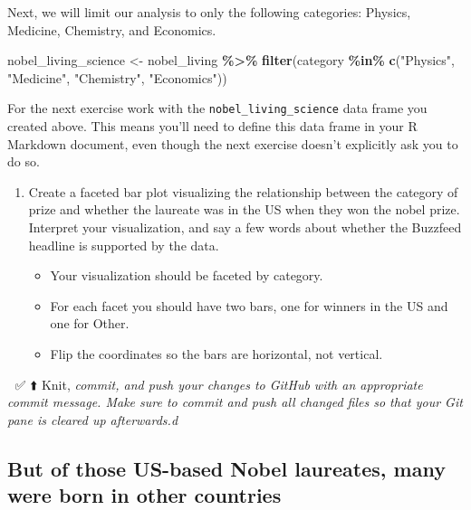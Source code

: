 \documentclass[
]{article}
\newenvironment{Shaded}{\begin{snugshade}}{\end{snugshade}}
\newcommand{\FunctionTok}[1]{\textcolor[rgb]{0.13,0.29,0.53}{\textbf{#1}}}
\newcommand{\NormalTok}[1]{#1}
\newcommand{\OtherTok}[1]{\textcolor[rgb]{0.56,0.35,0.01}{#1}}
\newcommand{\SpecialCharTok}[1]{\textcolor[rgb]{0.81,0.36,0.00}{\textbf{#1}}}
\newcommand{\StringTok}[1]{\textcolor[rgb]{0.31,0.60,0.02}{#1}}
\providecommand{\tightlist}{%
  \setlength{\itemsep}{0pt}\setlength{\parskip}{0pt}}
\begin{document}
Next, we will limit our analysis to only the following categories:
Physics, Medicine, Chemistry, and Economics.

\begin{Shaded}
\begin{Highlighting}[]
\NormalTok{nobel\_living\_science }\OtherTok{\textless{}{-}}\NormalTok{ nobel\_living }\SpecialCharTok{\%\textgreater{}\%}
  \FunctionTok{filter}\NormalTok{(category }\SpecialCharTok{\%in\%} \FunctionTok{c}\NormalTok{(}\StringTok{"Physics"}\NormalTok{, }\StringTok{"Medicine"}\NormalTok{, }\StringTok{"Chemistry"}\NormalTok{, }\StringTok{"Economics"}\NormalTok{))}
\end{Highlighting}
\end{Shaded}

For the next exercise work with the \texttt{nobel\_living\_science} data
frame you created above. This means you'll need to define this data
frame in your R Markdown document, even though the next exercise doesn't
explicitly ask you to do so.

\begin{enumerate}
\def\labelenumi{\arabic{enumi}.}
\setcounter{enumi}{2}
\item
  Create a faceted bar plot visualizing the relationship between the
  category of prize and whether the laureate was in the US when they won
  the nobel prize. Interpret your visualization, and say a few words
  about whether the Buzzfeed headline is supported by the data.

  \begin{itemize}
  \tightlist
  \item
    Your visualization should be faceted by category.
  \item
    For each facet you should have two bars, one for winners in the US
    and one for Other.
  \item
    Flip the coordinates so the bars are horizontal, not vertical.
  \end{itemize}
\end{enumerate}

🧶 ✅ ⬆️ Knit, \emph{commit, and push your changes to GitHub with an
appropriate commit message. Make sure to commit and push all changed
files so that your Git pane is cleared up afterwards.d}

\subsection{But of those US-based Nobel laureates, many were born in
other
countries}\label{but-of-those-us-based-nobel-laureates-many-were-born-in-other-countries}
\end{document}
